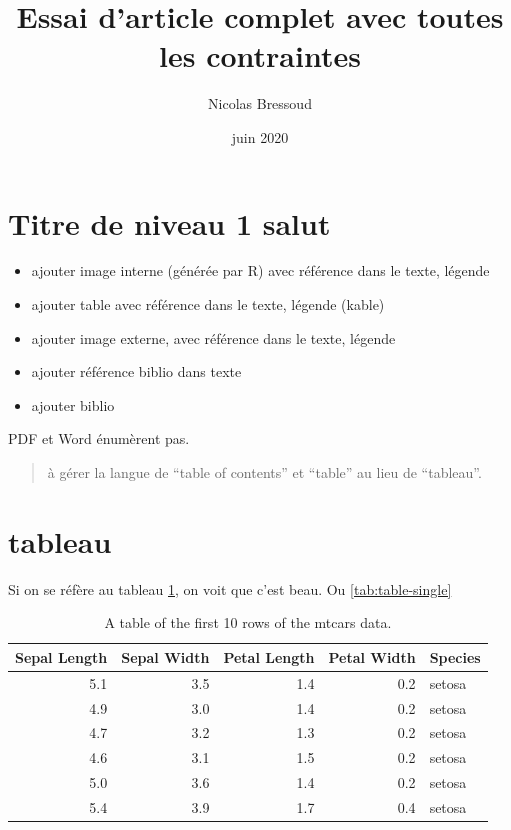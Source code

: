 \documentclass[
  french,
]{article}
\title{Essai d'article complet avec toutes les contraintes}
\author{Nicolas Bressoud}
\date{juin 2020}
\providecommand{\tightlist}{%
  \setlength{\itemsep}{0pt}\setlength{\parskip}{0pt}}
\begin{document}
\maketitle

\renewcommand*\contentsname{Table des matières}
{
\setcounter{tocdepth}{2}
\tableofcontents
}
\hypertarget{titre-de-niveau-1-salut}{%
\section{Titre de niveau 1 salut}\label{titre-de-niveau-1-salut}}

\begin{itemize}
\tightlist
\item
  ajouter image interne (générée par R) avec référence dans le texte, légende
\item
  ajouter table avec référence dans le texte, légende (kable)
\item
  ajouter image externe, avec référence dans le texte, légende
\item
  ajouter référence biblio dans texte
\item
  ajouter biblio
\end{itemize}

PDF et Word énumèrent pas.

\begin{quote}
à gérer la langue de ``table of contents'' et ``table'' au lieu de ``tableau''.
\end{quote}

\hypertarget{tableau}{%
\section{tableau}\label{tableau}}

Si on se réfère au tableau \ref{tab:iris-lol}, on voit que c'est beau. Ou \ref{tab:table-single}

\begin{table}

\caption{\label{tab:iris-lol}A table of the first 10 rows of the mtcars data.}
\centering
\begin{tabular}[t]{r|r|r|r|l}
\hline
Sepal Length & Sepal Width & Petal Length & Petal Width & Species\\
\hline
5.1 & 3.5 & 1.4 & 0.2 & setosa\\
\hline
4.9 & 3.0 & 1.4 & 0.2 & setosa\\
\hline
4.7 & 3.2 & 1.3 & 0.2 & setosa\\
\hline
4.6 & 3.1 & 1.5 & 0.2 & setosa\\
\hline
5.0 & 3.6 & 1.4 & 0.2 & setosa\\
\hline
5.4 & 3.9 & 1.7 & 0.4 & setosa\\
\hline
\end{tabular}
\end{table}
\end{document}
